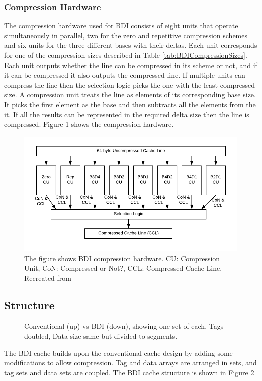 \subsubsection{Compression Hardware}
\label{sssec:BDICompressionHardware}
The compression hardware used for BDI consists of eight units that operate simultaneously in parallel, two for the zero and repetitive compression schemes and six units for the three different bases with their deltas. Each unit corresponds for one of the compression sizes described in Table \ref{tab:BDICompressionSizes}. Each unit outputs whether the line can be compressed in its scheme or not, and if it can be compressed it also outputs the compressed line. If multiple units can compress the line then the selection logic picks the one with the least compressed size.
A compression unit treats the line as elements of its corresponding base size. It picks the first element as the base and then subtracts all the elements from the it. If all the results can be represented in the required delta size then the line is compressed. Figure \ref{fig:BDIHardware} shows the compression hardware.
\begin{figure}
    \includegraphics[width=\textwidth]{BDIHardware.pdf}
    \caption[BDI Compression Hardware]{The figure shows BDI compression hardware. CU: Compression Unit, CoN: Compressed or Not?, CCL: Compressed Cache Line. Recreated from \protect\cite{bdi}}
    \label{fig:BDIHardware}
\end{figure}

\subsection{Structure}
\label{ssec:BDIStructure}
\begin{figure}
    \caption[BDI Cache]{Conventional (up) vs BDI (down), showing one set of each. Tags doubled, Data size same but divided to segments.}
    \label{fig:BDI}
\end{figure}
The BDI cache builds upon the conventional cache design by adding some modifications to allow compression. Tag and data arrays are arranged in sets, and tag sets and data sets are coupled. The BDI cache structure is shown in Figure \ref{fig:BDI}

